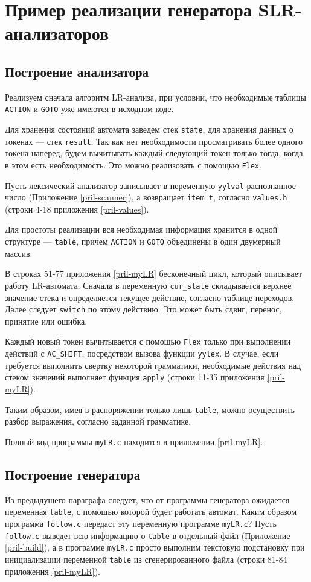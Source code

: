 \documentclass[bachelor, och, coursework, times]{SCWorks}
\begin{document}
\section{Пример реализации генератора SLR-анализаторов}
\subsection{Построение анализатора}
Реализуем сначала алгоритм LR-анализа, при условии, что необходимые таблицы \verb|ACTION| и  \verb|GOTO| уже имеются в исходном коде. 

Для хранения состояний автомата заведем стек \verb|state|, для хранения данных о токенах ---  стек \verb|result|. Так как нет необходимости просматривать более одного токена наперед, будем вычитывать каждый следующий токен только тогда, когда в этом есть необходимость. Это можно реализовать с помощью \verb|Flex|. 

Пусть лексический анализатор записывает в переменную \verb|yylval| распознанное число (Приложение \ref{pril-scanner}), а возвращает \verb|item_t|, согласно \verb|values.h| (строки 4-18 приложения \ref{pril-values}).

Для простоты реализации вся необходимая информация хранится в одной структуре --- \verb|table|, причем \verb|ACTION| и \verb|GOTO| объединены в один двумерный массив.

В строках 51-77 приложения \ref{pril-myLR} бесконечный цикл, который описывает работу LR-автомата. Сначала в переменную \verb|cur_state| складывается верхнее значение стека и определяется текущее действие, согласно таблице переходов. Далее следует \verb|switch| по этому действию. Это может быть сдвиг, перенос, принятие или ошибка.~\cite{Sokolov}

Каждый новый токен вычитывается с помощью \verb|Flex| только при выполнении действий с \verb|AC_SHIFT|, посредством вызова функции \verb|yylex|. В случае, если требуется выполнить свертку некоторой грамматики, необходимые действия над стеком значений выполняет функция \verb|apply| (строки 11-35 приложения \ref{pril-myLR}).

Таким образом, имея в распоряжении только лишь \verb|table|, можно осуществить разбор выражения, согласно заданной грамматике.

Полный код программы \verb|myLR.c| находится в приложении \ref{pril-myLR}.


\subsection{Построение генератора}
Из предыдущего параграфа следует, что от программы-генератора ожидается переменная \verb|table|, с помощью которой будет работать автомат. Каким образом программа \verb|follow.c| передаст эту переменную программе \verb|myLR.c|? Пусть \verb|follow.c| выведет всю информацию о \verb|table| в отдельный файл (Приложение \ref{pril-build}), а в программе \verb|myLR.c| просто выполним текстовую подстановку при инициализации переменной \verb|table| из сгенерированного файла (строки 81-84 приложения \ref{pril-myLR}).
\end{document}
